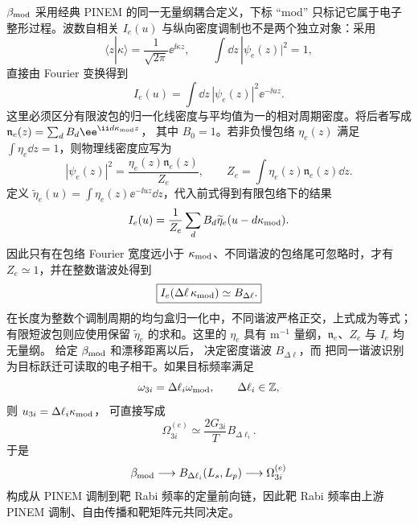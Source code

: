 $\beta_{\rm mod}$ 采用经典 PINEM 的同一无量纲耦合定义，下标 ``mod'' 只标记它属于电子整形过程。波数自相关 $I_e(u)$ 与纵向密度调制也不是两个独立对象：采用
\begin{equation*}
 \langle z|\kappa\rangle=\frac{1}{\sqrt{2\pi}}\ee^{\ii \kappa z},
 \qquad
 \int\dd z\,|\psi_e(z)|^2=1,
\end{equation*}
直接由 Fourier 变换得到
\begin{equation}
\boxed{
 I_e(u)=\int\dd z\,|\psi_e(z)|^2\ee^{-\ii uz}.}
\label{eq:electron_coherence_density_fourier_dp46}
\end{equation}
这里必须区分有限波包的归一化线密度与平均值为一的相对周期密度。将后者写成
$\mathfrak n_e(z)=\sum_dB_d\ee^{\ii d\kappa_{\rm mod}z}$，
其中 $B_0=1$。若非负慢包络 $\eta_e(z)$ 满足 $\int\eta_e\dd z=1$，则物理线密度应写为
\begin{equation*}
 |\psi_e(z)|^2=\frac{\eta_e(z)\mathfrak n_e(z)}{Z_e},\qquad
 Z_e=\int\eta_e(z)\mathfrak n_e(z)\dd z.
\end{equation*}
定义 $\widetilde\eta_e(u)=\int\eta_e(z)\ee^{-\ii uz}\dd z$，代入前式得到有限包络下的结果
\begin{equation*}
 I_e(u)=\frac1{Z_e}\sum_d B_d\widetilde\eta_e(u-d\kappa_{\rm mod}).
\end{equation*}
因此只有在包络 Fourier 宽度远小于 $\kappa_{\rm mod}$、不同谐波的包络尾可忽略时，才有 $Z_e\simeq1$，并在整数谐波处得到
\begin{equation}
\boxed{
 I_e(\Delta\ell\,\kappa_{\rm mod})\simeq B_{\Delta\ell}.}
\label{eq:electron_coherence_equals_bunching_dp46}
\end{equation}
在长度为整数个调制周期的均匀盒归一化中，不同谐波严格正交，上式成为等式；有限短波包则应使用保留 $\widetilde\eta_e$ 的求和。这里的 $\eta_e$ 具有 $\mathrm{m^{-1}}$ 量纲，$\mathfrak n_e$、$Z_e$ 与 $I_e$ 均无量纲。
给定 $\beta_{\rm mod}$ 和漂移距离以后， 决定密度谐波 $B_{\Delta\ell}$，而 把同一谐波识别为目标跃迁可读取的电子相干。如果目标频率满足
\begin{equation*}
 \omega_{3i}=\Delta\ell_i\omega_{\rm mod},
 \qquad \Delta\ell_i\in\mathbb Z,
\end{equation*}
则 $u_{3i}=\Delta\ell_i \kappa_{\rm mod}$， 可直接写成
\begin{equation}
\boxed{
 \Omega_{3i}^{(e)}
 \simeq\frac{2G_{3i}}{T}B_{\Delta\ell_i}.}
\label{eq:electron_rabi_from_bunching_dp46}
\end{equation}
于是
\begin{equation*}
 \beta_{\rm mod}
 \longrightarrow B_{\Delta\ell_i}(L_s,L_p)
 \longrightarrow\Omega_{3i}^{(e)}
\end{equation*}
构成从 PINEM 调制到靶 Rabi 频率的定量前向链，因此靶 Rabi 频率由上游 PINEM 调制、自由传播和靶矩阵元共同决定。

